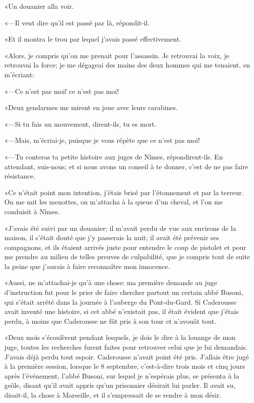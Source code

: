 «Un douanier alla voir. 

«—Il veut dire qu'il est passé par là, répondit-il. 

«Et il montra le trou par lequel j'avais passé effectivement.  

«Alors, je compris qu'on me prenait pour l'assassin. Je retrouvai la voix, je retrouvai la force; je me dégageai des mains des deux hommes qui me tenaient, en m'écriant: 

«—Ce n'est pas moi! ce n'est pas moi! 

«Deux gendarmes me mirent en joue avec leurs carabines. 

«—Si tu fais un mouvement, dirent-ils, tu es mort. 

«—Mais, m'écriai-je, puisque je vous répète que ce n'est pas moi! 

«—Tu conteras ta petite histoire aux juges de Nîmes, répondirent-ils. En attendant, suis-nous; et si nous avons un conseil à te donner, c'est de ne pas faire résistance. 

«Ce n'était point mon intention, j'étais brisé par l'étonnement et par la terreur. On me mit les menottes, on m'attacha à la queue d'un cheval, et l'on me conduisit à Nîmes. 

«J'avais été suivi par un douanier; il m'avait perdu de vue aux environs de la maison, il s'était douté que j'y passerais la nuit; il avait été prévenir ses compagnons, et ils étaient arrivés juste pour entendre le coup de pistolet et pour me prendre au milieu de telles preuves de culpabilité, que je compris tout de suite la peine que j'aurais à faire reconnaître mon innocence. 

«Aussi, ne m'attachai-je qu'à une chose: ma première demande au juge d'instruction fut pour le prier de faire chercher partout un certain abbé Busoni, qui s'était arrêté dans la journée à l'auberge du Pont-du-Gard. Si Caderousse avait inventé une histoire, si cet abbé n'existait pas, il était évident que j'étais perdu, à moins que Caderousse ne fût pris à son tour et n'avouât tout. 

«Deux mois s'écoulèrent pendant lesquels, je dois le dire à la louange de mon juge, toutes les recherches furent faites pour retrouver celui que je lui demandais. J'avais déjà perdu tout espoir. Caderousse n'avait point été pris. J'allais être jugé à la première session, lorsque le 8 septembre, c'est-à-dire trois mois et cinq jours après l'événement, l'abbé Busoni, sur lequel je n'espérais plus, se présenta à la geôle, disant qu'il avait appris qu'un prisonnier désirait lui parler. Il avait su, disait-il, la chose à Marseille, et il s'empressait de se rendre à mon désir. 

